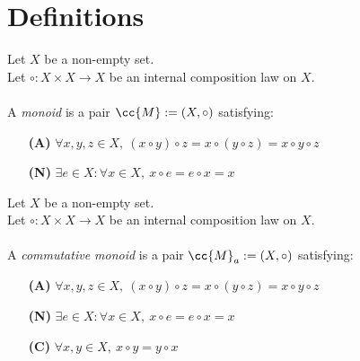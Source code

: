 \section{Definitions}

\begin{definition-pre}[Monoid]
    \label{def:monoid}
    Let \(X\) be a non-empty set.\\
    Let \(\circ: X\times X \to X\) be an internal composition law on \(X\). \\\\
    A \textit{monoid} is a pair \(\cc{M}:= (X, \circ)\) satisfying:
    \begin{enumerate}
        \item [\textbf{(A)}] \(\forall x,y,z\in X,\ (x\circ y)\circ z= x\circ (y\circ z) = x\circ y \circ z\)
        \item [\textbf{(N)}] \(\exists e \in X : \forall x \in X,\ x\circ e = e \circ x = x\)
    \end{enumerate}
\end{definition-pre}

\begin{definition-pre}
    \label{def:commutative_monoid}
    Let \(X\) be a non-empty set.\\
    Let \(\circ: X\times X \to X\) be an internal composition law on \(X\). \\\\
    A \textit{commutative monoid} is a pair \(\cc{M}_a:= (X, \circ)\) satisfying:
    \begin{enumerate}
        \item [\textbf{(A)}] \(\forall x,y,z\in X,\ (x\circ y)\circ z= x\circ (y\circ z) = x\circ y \circ z\)
        \item [\textbf{(N)}] \(\exists e \in X : \forall x \in X,\ x\circ e = e \circ x = x\)
        \item [\textbf{(C)}] \(\forall x,y\in X,\ x\circ y = y\circ x\)
    \end{enumerate}
\end{definition-pre}


